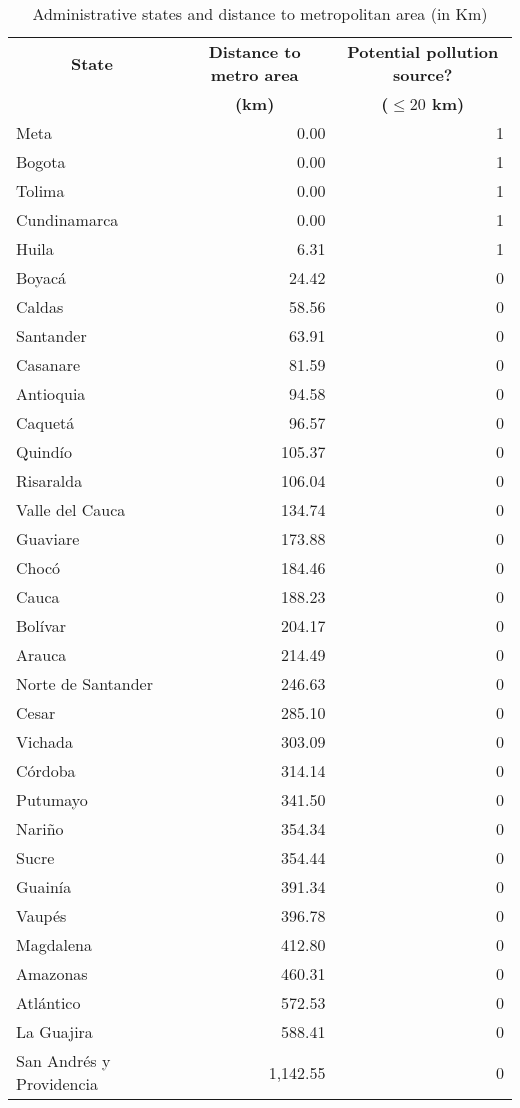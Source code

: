 \begin{table}[htbp]
  \centering
  \caption{Administrative states and distance to metropolitan area (in Km)}
  \begin{tabular}{lrr}
    \midrule
    \midrule
    \multicolumn{1}{c}{\textbf{State}} &
    \multicolumn{1}{c}{\textbf{Distance to metro area}} &
    \multicolumn{1}{c}{\textbf{Potential pollution source?}} \\
    \multicolumn{1}{c}{} &
    \multicolumn{1}{c}{\textbf{(km)}} &
    \multicolumn{1}{c}{\textbf{($\leq 20$ km)}} \\
    \midrule
    Meta & 0.00 & 1 \\
    Bogota & 0.00 & 1 \\
    Tolima & 0.00 & 1 \\
    Cundinamarca & 0.00 & 1 \\
    Huila & 6.31 & 1 \\
    Boyacá & 24.42 & 0 \\
    Caldas & 58.56 & 0 \\
    Santander & 63.91 & 0 \\
    Casanare & 81.59 & 0 \\
    Antioquia & 94.58 & 0 \\
    Caquetá & 96.57 & 0 \\
    Quindío & 105.37 & 0 \\
    Risaralda & 106.04 & 0 \\
    Valle del Cauca & 134.74 & 0 \\
    Guaviare & 173.88 & 0 \\
    Chocó & 184.46 & 0 \\
    Cauca & 188.23 & 0 \\
    Bolívar & 204.17 & 0 \\
    Arauca & 214.49 & 0 \\
    Norte de Santander & 246.63 & 0 \\
    Cesar & 285.10 & 0 \\
    Vichada & 303.09 & 0 \\
    Córdoba & 314.14 & 0 \\
    Putumayo & 341.50 & 0 \\
    Nariño & 354.34 & 0 \\
    Sucre & 354.44 & 0 \\
    Guainía & 391.34 & 0 \\
    Vaupés & 396.78 & 0 \\
    Magdalena & 412.80 & 0 \\
    Amazonas & 460.31 & 0 \\
    Atlántico & 572.53 & 0 \\
    La Guajira & 588.41 & 0 \\
    San Andrés y Providencia & 1,142.55 & 0 \\
    \bottomrule
    \bottomrule
  \end{tabular}
  \label{table_state_metro_distances}
\end{table}

